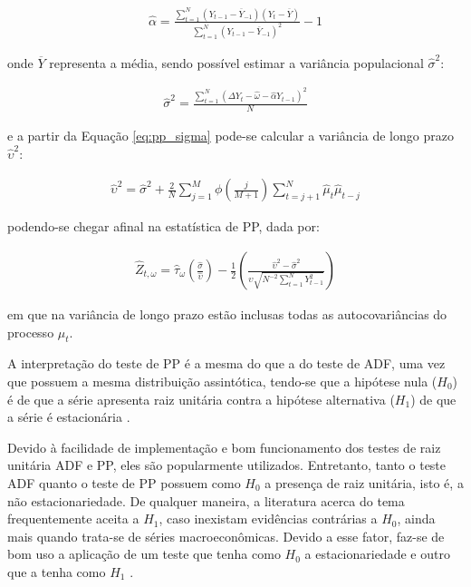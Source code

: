 \begin{ceqn}
\begin{align} \label{eq:pp_alpha}
\hat{\alpha} = \frac{\sum_{t=1}^{N}{(Y_{t-1} - \overline{Y}_{-1}) (Y_{t} - \overline{Y})}}{\sum_{t=1}^{N}{(Y_{t-1} - \overline{Y}_{-1})^2}} - 1
\end{align}
\end{ceqn} onde $\overline{Y}$ representa a média, sendo possível estimar a variância populacional $\hat{\sigma}^2$:

\begin{ceqn}
\begin{align} \label{eq:pp_sigma}
\hat{\sigma}^2 = \frac{\sum_{t=1}^{N}{(\Delta Y_{t} - \hat{\omega} - \hat{\alpha} Y_{t-1})^2}}{N}
\end{align}
\end{ceqn} e a partir da Equação \eqref{eq:pp_sigma} pode-se calcular a variância de longo prazo $\hat{\upsilon}^2$:

\begin{ceqn}
\begin{align} \label{eq:pp_vega}
\hat{\upsilon}^2 = \hat{\sigma}^2 + \frac{2}{N} \sum_{j=1}^{M}{\phi \left(\frac{j}{M+1} \right)} \sum_{t=j+1}^{N}{\hat{\mu}_{t} \hat{\mu}_{t-j}}
\end{align}
\end{ceqn} podendo-se chegar afinal na estatística de PP, dada por:

\begin{ceqn}
\begin{align} \label{eq:pp_total}
\hat{Z}_{t, \omega} = \hat{\tau}_{\omega} \left(\frac{\hat{\sigma}}{\hat{\upsilon}} \right) - \frac{1}{2} \left(\frac{\hat{\upsilon}^2 - \hat{\sigma}^2}{\hat{\upsilon} \sqrt{N^{-2} \sum_{t=1}^{N} Y_{t-1}^2}} \right)
\end{align}
\end{ceqn} em que na variância de longo prazo estão inclusas todas as autocovariâncias do processo $\mu_{t}$.

A interpretação do teste de PP é a mesma do que a do teste de ADF, uma vez que possuem a mesma distribuição assintótica, tendo-se que a hipótese nula ($H_{0}$) é de que a série apresenta raiz unitária contra a hipótese alternativa ($H_{1}$) de que a série é estacionária \cite{bueno2008, gujarati_ecn2011}.


Devido à facilidade de implementação e bom funcionamento dos testes de raiz unitária ADF e PP, eles são popularmente utilizados. Entretanto, tanto o teste ADF quanto o teste de PP possuem como $H_{0}$ a presença de raiz unitária, isto é, a não estacionariedade. De qualquer maneira, a literatura acerca do tema frequentemente aceita a $H_{1}$, caso inexistam evidências contrárias a $H_{0}$, ainda mais quando trata-se de séries macroeconômicas. Devido a esse fator, faz-se de bom uso a aplicação de um teste que tenha como $H_{0}$ a estacionariedade e outro que a tenha como $H_{1}$ \cite{kennedy2008guide_to_econometrics}.

